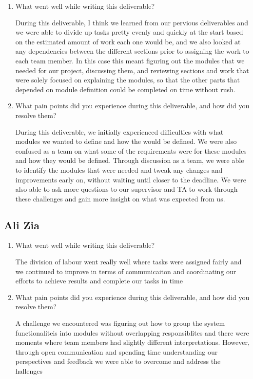 \documentclass[12pt, titlepage]{article}
\begin{document}
\begin{enumerate}
    \item What went well while writing this deliverable? 

    During this deliverable, I think we learned from our pervious deliverables and we were able to divide up tasks pretty evenly and quickly at the start based on the estimated amount of work each one would be, and we also looked at any dependencies between the different sections prior to assigning the work to each team member. In this case this meant figuring out the modules that we needed for our project, discussing them, and reviewing sections and work that were solely focused on explaining the modules, so that the other parts that depended on module definition could be completed on time without rush.

    \item What pain points did you experience during this deliverable, and how
    did you resolve them?

    During this deliverable, we initially experienced difficulties with what modules we wanted to define and how the would be defined. We were also confused as a team on what some of the requirements were for these modules and how they would be defined. Through discussion as a team, we were able to identify the modules that were needed and tweak any changes and improvements early on, without waiting until closer to the deadline. We were also able to ask more questions to our supervisor and TA to work through these challenges and gain more insight on what was expected from us.
    
\end{enumerate}

\subsection{Ali Zia}

\begin{enumerate}
    \item What went well while writing this deliverable? 

    The division of labour went really well where tasks were assigned fairly and we continued to improve in terms of communicaiton and coordinating our efforts to achieve results and complete our tasks in time

    \item What pain points did you experience during this deliverable, and how
    did you resolve them?

    A challenge we encountered was figuring out how to group the system functionaliteis into modules without overlapping responsiblites and there were moments where team members had slightly different interpretations. However, through open communication and spending time understanding our perspectives and feedback we were able to overcome and address the hallenges

\end{enumerate}
\end{document}
